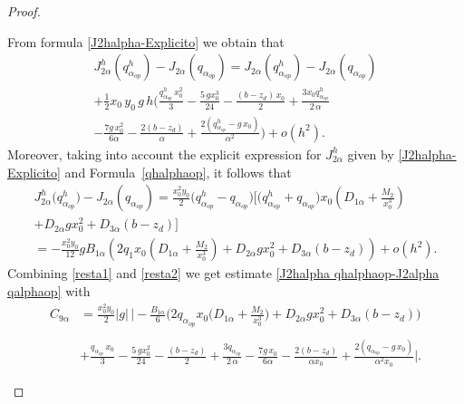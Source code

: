 \documentclass[axioms,article,submit,moreauthors]{Definitions/mdpi}
\begin{document}
\begin{proof}
\begin{itemize}
From formula \eqref{J2halpha-Explicito} we obtain that
    \begin{equation}\label{resta1}
    \begin{array}{ll}
    { J^h_{2 \alpha}}({ q^h_{\alpha_{op}}})-J_{2\alpha}(q_{\alpha_{op}})=    J_{2\alpha}({ q^h_{\alpha_{op}}})-J_{2\alpha}(q_{\alpha_{op}}) \\[0.45cm]
    + \tfrac{1}{2} x_0\,y_0 \,g \,h \Big(   \tfrac{ { q^h_{\alpha_{op}}}\,x_0^2}{3}   - \tfrac{5\,g x_0^3}{24}  - \tfrac{(b-z_d)\,x_0}{2} 
    + \tfrac{3 x_0 { q^h_{\alpha_{op}}}}{2\,\alpha}\\[0.45cm]
    - \tfrac{7 g\,x_0^2}{6\alpha} - \tfrac{2(b-z_d)}{\alpha}+ \tfrac{2({ q^h_{\alpha_{op}}}-g\,x_0)}{\alpha^2}\Big)+o(h^2).
    \end{array}
    \end{equation}
Moreover, taking into account the explicit expression for ${J^h_{2\alpha}}$ given by  \eqref{J2halpha-Explicito} and \mbox{Formula~\eqref{qhalphaop}}, it follows that
\begin{equation}\label{resta2}
    \begin{array}{ll}
  {  J^h_{2\alpha}( q^h_{\alpha_{op}}})-J_{2\alpha}(q_{\alpha_{op}})= \frac{x_0^2 y_0}{2}\big({ q^h_{\alpha_{op}}}-q_{\alpha_{op}}\big) \Big[\big({ q^h_{\alpha_{op}}}+q_{\alpha_{op}}\big)x_0  \left(D_{1\alpha}+\tfrac{M_2}{x_0^3} \right)\\
    + D_{2\alpha}g x_0^2+D_{3\alpha}(b-z_d) \Big]\\
=-\frac{x_0^2 y_0}{12}  g B_{1\alpha}  \left(2q_1 x_0 \left(D_{1\alpha}+\frac{M_2}{x_0^3}\right)+D_{2\alpha} g x_0^2+D_{3\alpha} (b-z_d)\right)+o(h^2).
    \end{array}
\end{equation}    
    Combining \eqref{resta1} and \eqref{resta2} we get estimate \eqref{J2halpha qhalphaop-J2alpha qalphaop} with 
    \begin{equation*}
      \begin{array}{ll}
     C_{9\alpha}&=\frac{x_0^2 y_0}{2} |g| \,\Big| -\frac{B_{1\alpha}}{6}\Big(2 q_{\alpha_{op}} x_0 \Big(  D_{1\alpha}+\frac{M_2}{x_0^3}\Big)+D_{2\alpha}gx_0^2+D_{3\alpha}(b-z_d) \Big)\\
     \\
    & +  \frac{ q_{\alpha_{op}}\,x_0}{3}   - \frac{5\,g x_0^2}{24}  - \frac{(b-z_d)}{2} 
     + \frac{3  q_{\alpha_{op}}}{2\,\alpha} - \frac{7 g\,x_0}{6\alpha} - \frac{2(b-z_d)}{\alpha x_0}+ \frac{2(q_{\alpha_{op}}-g\,x_0)}{\alpha^2 x_0}\Big|.
     \end{array}
    \end{equation*}

    \end{itemize}
    \end{proof}
\end{document}
